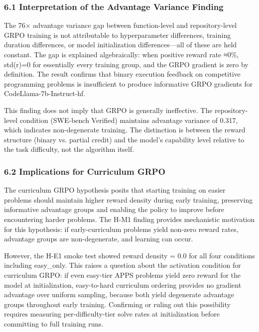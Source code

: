 
\subsubsection{6.1 Interpretation of the Advantage Variance Finding}

The 76× advantage variance gap between function-level and repository-level GRPO training is not attributable to hyperparameter differences, training duration differences, or model initialization differences—all of these are held constant. The gap is explained algebraically: when positive reward rate ≈0\%, std(r)=0 for essentially every training group, and the GRPO gradient is zero by definition. The result confirms that binary execution feedback on competitive programming problems is insufficient to produce informative GRPO gradients for CodeLlama-7b-Instruct-hf.

This finding does not imply that GRPO is generally ineffective. The repository-level condition (SWE-bench Verified) maintains advantage variance of 0.317, which indicates non-degenerate training. The distinction is between the reward structure (binary vs. partial credit) and the model's capability level relative to the task difficulty, not the algorithm itself.

\subsubsection{6.2 Implications for Curriculum GRPO}

The curriculum GRPO hypothesis posits that starting training on easier problems should maintain higher reward density during early training, preserving informative advantage groups and enabling the policy to improve before encountering harder problems. The H-M1 finding provides mechanistic motivation for this hypothesis: if early-curriculum problems yield non-zero reward rates, advantage groups are non-degenerate, and learning can occur.

However, the H-E1 smoke test showed reward density = 0.0 for all four conditions including easy_only. This raises a question about the activation condition for curriculum GRPO: if even easy-tier APPS problems yield zero reward for the model at initialization, easy-to-hard curriculum ordering provides no gradient advantage over uniform sampling, because both yield degenerate advantage groups throughout early training. Confirming or ruling out this possibility requires measuring per-difficulty-tier solve rates at initialization before committing to full training runs.

